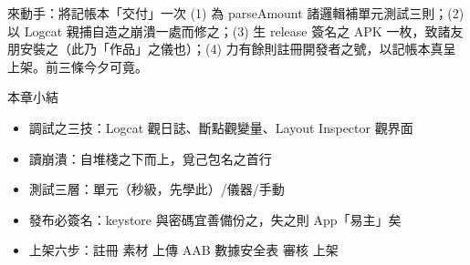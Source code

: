 \begin{tcbpractice}{來動手：將記帳本「交付」一次}
(1) 為 parseAmount 諸邏輯補單元測試三則；(2) 以 Logcat 親捕自造之崩潰一處而修之；(3) 生 release 簽名之 APK 一枚，致諸友朋安裝之（此乃「作品」之儀也）；(4) 力有餘則註冊開發者之號，以記帳本真呈上架。前三條今夕可竟。

\end{tcbpractice}

\begin{tcbsummary}{本章小結}
\begin{itemize}
  \item 調試之三技：Logcat 觀日誌、斷點觀變量、Layout Inspector 觀界面
  \item 讀崩潰：自堆棧之下而上，覓己包名之首行
  \item 測試三層：單元（秒級，先學此）/儀器/手動
  \item 發布必簽名：keystore 與密碼宜善備份之，失之則 App「易主」矣
  \item 上架六步：註冊 素材 上傳 AAB 數據安全表 審核 上架
\end{itemize}

\end{tcbsummary}
